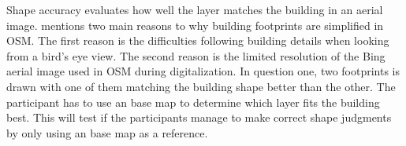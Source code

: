 
Shape accuracy evaluates how well the layer matches the building in an aerial image. \cite{Fan2014} mentions two main reasons to why building footprints are simplified in OSM. The first reason is the difficulties following building details when looking from a bird's eye view. The second reason is the limited resolution of the Bing aerial image used in OSM during digitalization. In question one, two footprints is drawn with one of them matching the building shape better than the other. The participant has to use an base map to determine which layer fits the building best. This will test if the participants manage to make correct shape judgments by only using an base map as a reference. 

